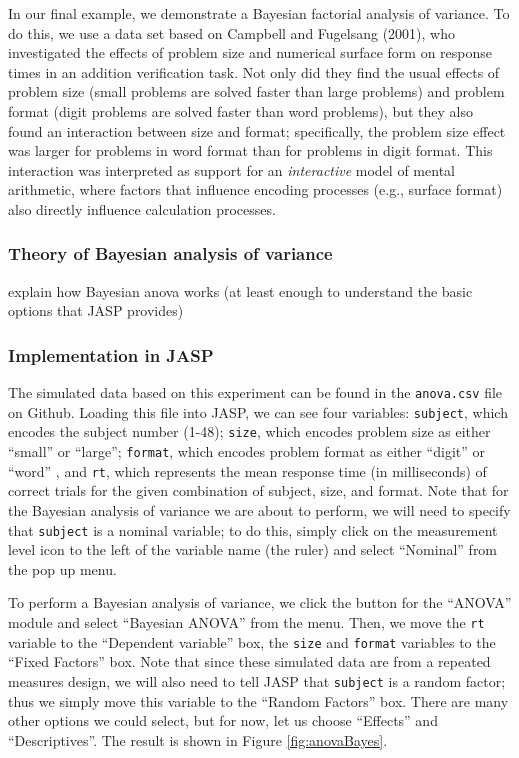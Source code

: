 \documentclass[english,,doc,floatsintext]{apa6}
\begin{document}
In our final example, we demonstrate a Bayesian factorial analysis of variance. To do this, we use a data set based on Campbell and Fugelsang (2001), who investigated the effects of problem size and numerical surface form on response times in an addition verification task. Not only did they find the usual effects of problem size (small problems are solved faster than large problems) and problem format (digit problems are solved faster than word problems), but they also found an interaction between size and format; specifically, the problem size effect was larger for problems in word format than for problems in digit format. This interaction was interpreted as support for an \emph{interactive} model of mental arithmetic, where factors that influence encoding processes (e.g., surface format) also directly influence calculation processes.

\hypertarget{theory-of-bayesian-analysis-of-variance}{%
\subsubsection{Theory of Bayesian analysis of variance}\label{theory-of-bayesian-analysis-of-variance}}

explain how Bayesian anova works (at least enough to understand the basic options that JASP provides)

\hypertarget{implementation-in-jasp-2}{%
\subsubsection{Implementation in JASP}\label{implementation-in-jasp-2}}

The simulated data based on this experiment can be found in the \texttt{anova.csv} file on Github. Loading this file into JASP, we can see four variables: \texttt{subject}, which encodes the subject number (1-48); \texttt{size}, which encodes problem size as either \enquote{small} or \enquote{large}; \texttt{format}, which encodes problem format as either \enquote{digit} or \enquote{word} , and \texttt{rt}, which represents the mean response time (in milliseconds) of correct trials for the given combination of subject, size, and format. Note that for the Bayesian analysis of variance we are about to perform, we will need to specify that \texttt{subject} is a nominal variable; to do this, simply click on the measurement level icon to the left of the variable name (the ruler) and select \enquote{Nominal} from the pop up menu.

To perform a Bayesian analysis of variance, we click the button for the \enquote{ANOVA} module and select \enquote{Bayesian ANOVA} from the menu. Then, we move the \texttt{rt} variable to the \enquote{Dependent variable} box, the \texttt{size} and \texttt{format} variables to the \enquote{Fixed Factors} box. Note that since these simulated data are from a repeated measures design, we will also need to tell JASP that \texttt{subject} is a random factor; thus we simply move this variable to the \enquote{Random Factors} box. There are many other options we could select, but for now, let us choose \enquote{Effects} and \enquote{Descriptives}. The result is shown in Figure \ref{fig:anovaBayes}.
\end{document}
